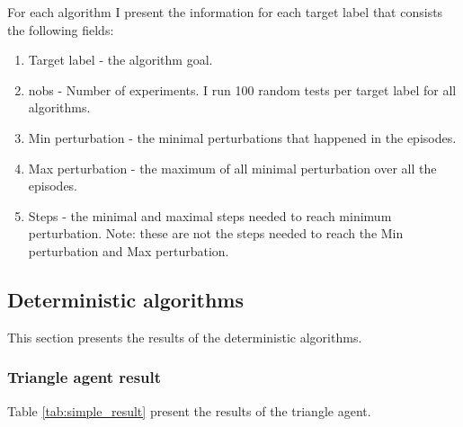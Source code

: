 \documentclass{article}
\begin{document}
For each algorithm I present the information for each target label that consists the following fields:

\begin{enumerate}
\item Target label - the algorithm goal.
\item nobs - Number of experiments. I run 100 random tests per target label for all algorithms.
\item Min perturbation - the minimal perturbations that happened in the episodes. 
\item Max perturbation - the maximum of all minimal perturbation over all the episodes.
\item Steps - the minimal and maximal steps needed to reach minimum perturbation. Note: these are not the steps needed to reach the Min perturbation and Max perturbation.
\end{enumerate}

\subsection{Deterministic algorithms}
This section presents the results of the deterministic algorithms. 

\subsubsection{Triangle agent result}
Table \ref{tab:simple_result} present the results of the triangle agent.
\end{document}
